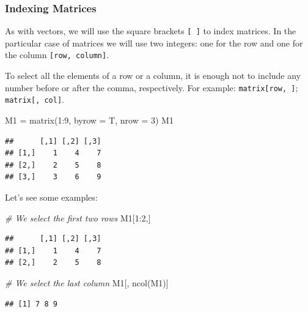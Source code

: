 \documentclass[
]{book}
\newenvironment{Shaded}{\begin{snugshade}}{\end{snugshade}}
\newcommand{\AttributeTok}[1]{\textcolor[rgb]{0.77,0.63,0.00}{#1}}
\newcommand{\CommentTok}[1]{\textcolor[rgb]{0.56,0.35,0.01}{\textit{#1}}}
\newcommand{\DecValTok}[1]{\textcolor[rgb]{0.00,0.00,0.81}{#1}}
\newcommand{\FunctionTok}[1]{\textcolor[rgb]{0.00,0.00,0.00}{#1}}
\newcommand{\NormalTok}[1]{#1}
\newcommand{\OtherTok}[1]{\textcolor[rgb]{0.56,0.35,0.01}{#1}}
\newcommand{\SpecialCharTok}[1]{\textcolor[rgb]{0.00,0.00,0.00}{#1}}
\theoremstyle{definition}
\theoremstyle{definition}
\theoremstyle{definition}
\theoremstyle{definition}
\theoremstyle{remark}
\begin{document}
\hypertarget{indexing-matrices}{%
\subsubsection{Indexing Matrices}\label{indexing-matrices}}

As with vectors, we will use the square brackets \texttt{{[}\ {]}} to index matrices. In the particular case of matrices we will use two integers: one for the row and one for the column \texttt{{[}row,\ column{]}}.

To select all the elements of a row or a column, it is enough not to include any number before or after the comma, respectively. For example: \texttt{matrix{[}row,\ {]}}; \texttt{matrix{[},\ col{]}}.

\begin{Shaded}
\begin{Highlighting}[]
\NormalTok{M1 }\OtherTok{=} \FunctionTok{matrix}\NormalTok{(}\DecValTok{1}\SpecialCharTok{:}\DecValTok{9}\NormalTok{, }\AttributeTok{byrow =}\NormalTok{ T, }\AttributeTok{nrow =} \DecValTok{3}\NormalTok{)}
\NormalTok{M1}
\end{Highlighting}
\end{Shaded}

\begin{verbatim}
##      [,1] [,2] [,3]
## [1,]    1    4    7
## [2,]    2    5    8
## [3,]    3    6    9
\end{verbatim}

Let's see some examples:

\begin{Shaded}
\begin{Highlighting}[]
\CommentTok{\# We select the first two rows}
\NormalTok{M1[}\DecValTok{1}\SpecialCharTok{:}\DecValTok{2}\NormalTok{,]}
\end{Highlighting}
\end{Shaded}

\begin{verbatim}
##      [,1] [,2] [,3]
## [1,]    1    4    7
## [2,]    2    5    8
\end{verbatim}

\begin{Shaded}
\begin{Highlighting}[]
\CommentTok{\# We select the last column}
\NormalTok{M1[, }\FunctionTok{ncol}\NormalTok{(M1)]}
\end{Highlighting}
\end{Shaded}

\begin{verbatim}
## [1] 7 8 9
\end{verbatim}
\end{document}
